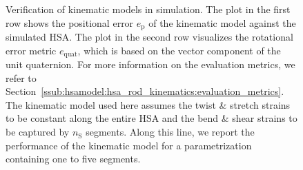 \begin{figure}[t]
    \centering
    
    \caption{Verification of kinematic models in simulation. 
    The plot in the first row shows the positional error $e_\mathrm{p}$ of the kinematic model against the simulated HSA. The plot in the second row visualizes the rotational error metric $e_\mathrm{quat}$, which is based on the vector component of the unit quaternion. For more information on the evaluation metrics, we refer to Section~\ref{ssub:hsamodel:hsa_rod_kinematics:evaluation_metrics}.
    The kinematic model used here assumes the twist \& stretch strains to be constant along the entire HSA and the bend \& shear strains to be captured by $n_\mathrm{S}$ segments.
    Along this line, we report the performance of the kinematic model for a parametrization containing one to five segments.
    }\label{fig:hsamodel:hsa_robot_simulation_kinematic_error_vs_number_of_PCS_segments}
\end{figure}


